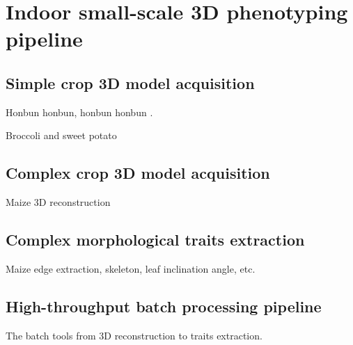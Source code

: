 \chapter{Indoor small-scale 3D phenotyping pipeline}

\section{Simple crop 3D model acquisition}

Honbun honbun, honbun honbun \citep{zhao_crop_2019}. 

Broccoli and sweet potato


\section{Complex crop 3D model acquisition}

Maize 3D reconstruction

\newpage


\section{Complex morphological traits extraction}

Maize edge extraction, skeleton, leaf inclination angle, etc.

\section{High-throughput batch processing pipeline}

The batch tools from 3D reconstruction to traits extraction.
